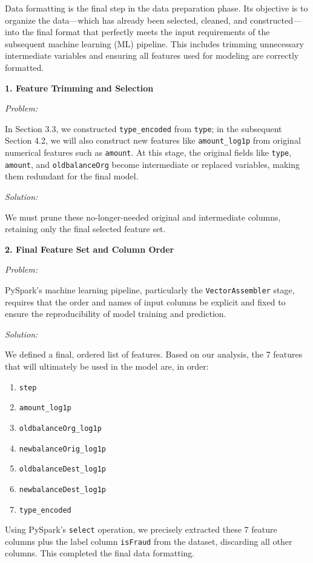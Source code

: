 \documentclass[sigplan,screen]{acmart}
\begin{document}
Data formatting is the final step in the data preparation phase. Its objective is to organize the data---which has already been selected, cleaned, and constructed---into the final format that perfectly meets the input requirements of the subsequent machine learning (ML) pipeline. This includes trimming unnecessary intermediate variables and ensuring all features used for modeling are correctly formatted.

\textbf{1. Feature Trimming and Selection}

\textit{Problem:}

In Section 3.3, we constructed \texttt{type\_encoded} from \texttt{type}; in the subsequent Section 4.2, we will also construct new features like \texttt{amount\_log1p} from original numerical features such as \texttt{amount}. At this stage, the original fields like \texttt{type}, \texttt{amount}, and \texttt{oldbalanceOrg} become intermediate or replaced variables, making them redundant for the final model.

\textit{Solution:}

We must prune these no-longer-needed original and intermediate columns, retaining only the final selected feature set.

\textbf{2. Final Feature Set and Column Order}

\textit{Problem:}

PySpark's machine learning pipeline, particularly the \texttt{Vector\allowbreak Assembler} stage, requires that the order and names of input columns be explicit and fixed to ensure the reproducibility of model training and prediction.

\textit{Solution:}

We defined a final, ordered list of features. Based on our analysis, the 7 features that will ultimately be used in the model are, in order:

\begin{enumerate}
\item \texttt{step}
\item \texttt{amount\_log1p}
\item \texttt{oldbalanceOrg\_log1p}
\item \texttt{newbalanceOrig\_log1p}
\item \texttt{oldbalanceDest\_log1p}
\item \texttt{newbalanceDest\_log1p}
\item \texttt{type\_encoded}
\end{enumerate}

Using PySpark's \texttt{select} operation, we precisely extracted these 7 feature columns plus the label column \texttt{isFraud} from the dataset, discarding all other columns. This completed the final data formatting.
\end{document}
